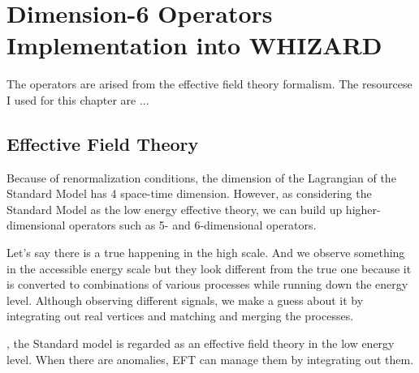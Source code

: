 
\chapter{Dimension-6 Operators Implementation into WHIZARD}

The operators are arised from the effective field theory formalism. 
The resourcese I used for this chapter are ...

\section{Effective Field Theory}
\label{sec:eft}




Because of renormalization conditions, 
the dimension of the Lagrangian of the Standard Model has 4 space-time dimension.
However, as considering the Standard Model as the low energy effective theory, 
we can build up higher-dimensional operators such as 5- and 6-dimensional operators.

Let's say there is a true happening in the high scale. 
And we observe something in the accessible energy scale but they look different from the true one
because it is converted to combinations of various processes while running down the energy level. 
Although observing different signals, we make a guess about it
by integrating out real vertices and matching and merging the processes. 


, 
the Standard model is regarded as an effective field theory in the low energy level. 
When there are anomalies, EFT can manage them by integrating out them.

